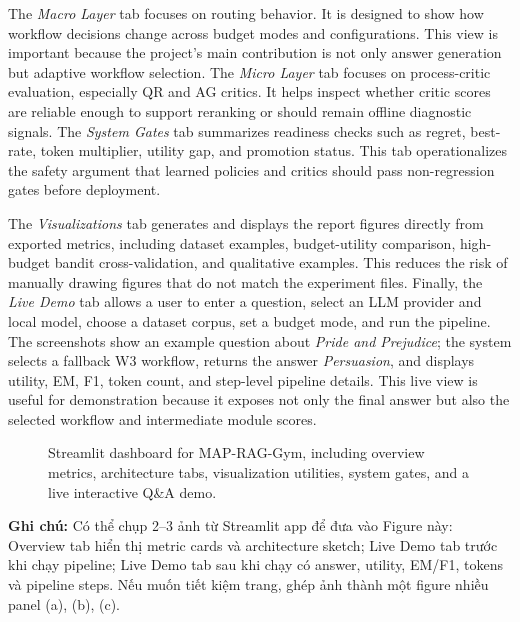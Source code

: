 \documentclass[12pt,a4paper]{article}
\newcommand{\vnote}[1]{{\selectlanguage{vietnamese}\noindent\textcolor{notered}{\textbf{Ghi chú:} #1}\selectlanguage{english}}}
\begin{document}
The \textit{Macro Layer} tab focuses on routing behavior. It is designed to show how workflow decisions change across budget modes and configurations. This view is important because the project's main contribution is not only answer generation but adaptive workflow selection. The \textit{Micro Layer} tab focuses on process-critic evaluation, especially QR and AG critics. It helps inspect whether critic scores are reliable enough to support reranking or should remain offline diagnostic signals. The \textit{System Gates} tab summarizes readiness checks such as regret, best-rate, token multiplier, utility gap, and promotion status. This tab operationalizes the safety argument that learned policies and critics should pass non-regression gates before deployment.

The \textit{Visualizations} tab generates and displays the report figures directly from exported metrics, including dataset examples, budget-utility comparison, high-budget bandit cross-validation, and qualitative examples. This reduces the risk of manually drawing figures that do not match the experiment files. Finally, the \textit{Live Demo} tab allows a user to enter a question, select an LLM provider and local model, choose a dataset corpus, set a budget mode, and run the pipeline. The screenshots show an example question about \textit{Pride and Prejudice}; the system selects a fallback W3 workflow, returns the answer \textit{Persuasion}, and displays utility, EM, F1, token count, and step-level pipeline details. This live view is useful for demonstration because it exposes not only the final answer but also the selected workflow and intermediate module scores.

\begin{figure}[H]
\centering
\caption{Streamlit dashboard for MAP-RAG-Gym, including overview metrics, architecture tabs, visualization utilities, system gates, and a live interactive Q\&A demo.}
\label{fig:streamlit_dashboard}
\end{figure}
\vnote{Có thể chụp 2--3 ảnh từ Streamlit app để đưa vào Figure này: Overview tab hiển thị metric cards và architecture sketch; Live Demo tab trước khi chạy pipeline; Live Demo tab sau khi chạy có answer, utility, EM/F1, tokens và pipeline steps. Nếu muốn tiết kiệm trang, ghép ảnh thành một figure nhiều panel (a), (b), (c).}
\end{document}
